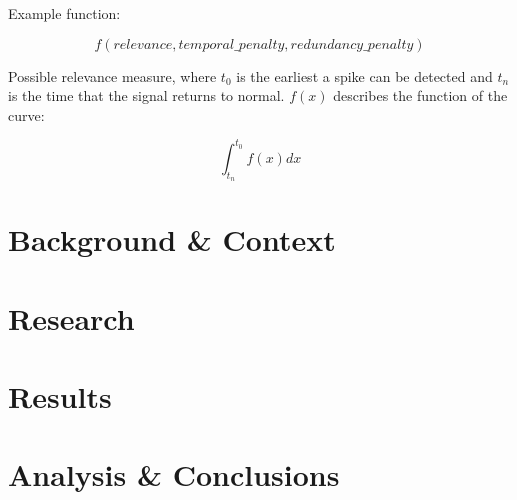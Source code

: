 \documentclass{uvamscse}	%
\begin{document}
Example function:

\begin{equation}
	f(relevance, temporal\_penalty, redundancy\_penalty)
\end{equation}


Possible relevance measure, where $t_0$ is the earliest a spike can be detected and $t_n$ is the time that the signal 
returns to normal. $f(x)$ describes the function of the curve:

\begin{equation}
	\int^{t_0}_{t_n} f(x) dx
\end{equation}

\chapter{Background \& Context}

\chapter{Research}

\chapter{Results}

\chapter{Analysis \& Conclusions}


\printbibliography

\newpage

\end{document}
